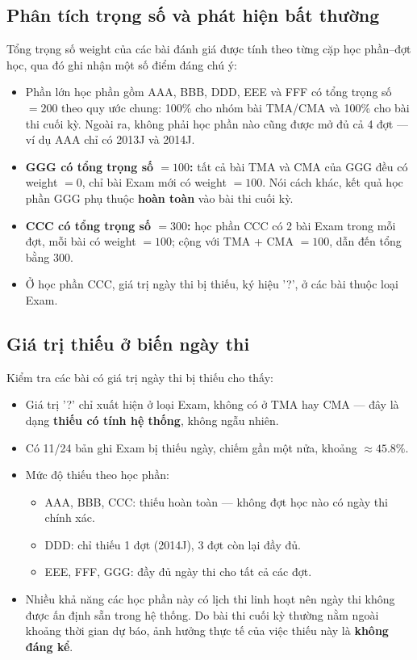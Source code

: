 \documentclass[a4paper]{report}
\newcommand{\code}[1]{{\ttfamily\def\_{\textunderscore\discretionary{}{}{}}#1}}
\def\code#1{#1}%
\def\_{ }%
\begin{document}
\subsection{Phân tích trọng số và phát hiện bất thường}

Tổng trọng số \code{weight} của các bài đánh giá được tính theo từng cặp học
phần--đợt học, qua đó ghi nhận một số điểm đáng chú ý:

\begin{itemize}[leftmargin=*]
  \item Phần lớn học phần gồm AAA, BBB, DDD, EEE và FFF có tổng trọng số $= 200$
        theo quy ước chung: 100\% cho nhóm bài TMA/CMA và 100\% cho bài thi
        cuối kỳ. Ngoài ra, không phải học phần nào cũng được mở đủ cả 4 đợt ---
        ví dụ AAA chỉ có 2013J và 2014J.
  \item \textbf{GGG có tổng trọng số $= 100$:} tất cả bài TMA và CMA của GGG đều
        có \code{weight} $= 0$, chỉ bài Exam mới có \code{weight} $= 100$. Nói
        cách khác, kết quả học phần GGG phụ thuộc \textbf{hoàn toàn} vào bài thi
        cuối kỳ.
  \item \textbf{CCC có tổng trọng số $= 300$:} học phần CCC có 2 bài Exam trong
        mỗi đợt, mỗi bài có \code{weight} $= 100$; cộng với TMA + CMA $= 100$, dẫn
        đến tổng bằng 300.
  \item Ở học phần CCC, giá trị ngày thi bị thiếu, ký hiệu \code{'?'}, ở các bài
        thuộc loại Exam.
\end{itemize}

\subsection{Giá trị thiếu ở biến ngày thi}

Kiểm tra các bài có giá trị ngày thi bị thiếu cho thấy:

\begin{itemize}[leftmargin=*]
  \item Giá trị \code{'?'} chỉ xuất hiện ở loại Exam, không có ở TMA hay CMA ---
        đây là dạng \textbf{thiếu có tính hệ thống}, không ngẫu nhiên.
  \item Có 11/24 bản ghi Exam bị thiếu ngày, chiếm gần một nửa, khoảng
        $\approx 45.8\%$.
  \item Mức độ thiếu theo học phần:
    \begin{itemize}
      \item AAA, BBB, CCC: thiếu hoàn toàn --- không đợt học nào có ngày thi
            chính xác.
      \item DDD: chỉ thiếu 1 đợt (2014J), 3 đợt còn lại đầy đủ.
      \item EEE, FFF, GGG: đầy đủ ngày thi cho tất cả các đợt.
    \end{itemize}
  \item Nhiều khả năng các học phần này có lịch thi linh hoạt nên ngày thi
        không được ấn định sẵn trong hệ thống. Do bài thi cuối kỳ thường nằm
        ngoài khoảng thời gian dự báo, ảnh hưởng thực tế của việc thiếu này là
        \textbf{không đáng kể}.
\end{itemize}
\end{document}
